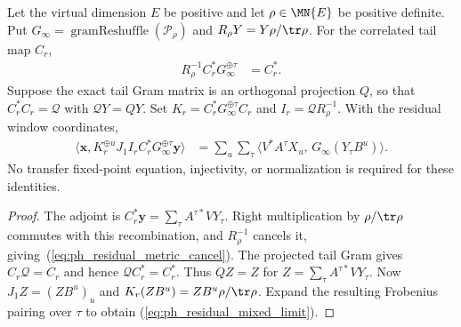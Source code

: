 \begin{lemma}
    \label{thm:residual_window_limiting_cancellation}
    \leanok
    Let the virtual dimension $E$ be positive and let $\rho\in\MN{E}$ be
    positive definite. Put $G_\infty=\operatorname{gramReshuffle}(\mathcal P_\rho)$
    and $R_\rho Y=Y\rho/\tr\rho$. For the correlated tail map $C_r$,
    \begin{align}
        R_\rho^{-1}C_r^*G_\infty^{\oplus\tau} & =C_r^*.
        \label{eq:ph_residual_metric_cancel}
    \end{align}
    Suppose the exact tail Gram matrix is an orthogonal projection $Q$, so that
    $C_r^*C_r=\mathcal Q$ with $\mathcal QY=QY$. Set
    $K_r=C_r^*G_\infty^{\oplus\tau}C_r$ and $I_r=\mathcal Q R_\rho^{-1}$.
    With the residual window coordinates,
    \begin{align}
        \big\langle \mathbf x,
        K_r^{\oplus u}J_1I_rC_r^*G_\infty^{\oplus\tau}\mathbf y\big\rangle
         & =\sum_u\sum_\tau
        \big\langle V^*A^\tau X_u,\,G_\infty(Y_\tau B^u)\big\rangle.
        \label{eq:ph_residual_mixed_limit}
    \end{align}
    No transfer fixed-point equation, injectivity, or normalization is required
    for these identities.
\end{lemma}
\begin{proof}\leanok
    The adjoint is $C_r^*\mathbf y=\sum_\tau A^{\tau*}VY_\tau$.
    Right multiplication by $\rho/\tr\rho$ commutes with this recombination,
    and $R_\rho^{-1}$ cancels it, giving~(\ref{eq:ph_residual_metric_cancel}).
    The projected tail Gram gives $C_r\mathcal Q=C_r$ and hence
    $\mathcal Q C_r^*=C_r^*$. Thus $QZ=Z$ for
    $Z=\sum_\tau A^{\tau*}VY_\tau$.
    Now $J_1Z=(ZB^u)_u$ and $K_r(ZB^u)=ZB^u\rho/\tr\rho$.
    Expand the resulting Frobenius pairing over $\tau$ to obtain
    (\ref{eq:ph_residual_mixed_limit}).
\end{proof}

